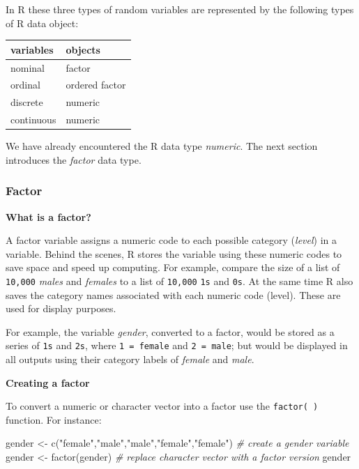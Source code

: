 \documentclass[
]{book}
\newenvironment{Shaded}{\begin{snugshade}}{\end{snugshade}}
\newcommand{\CommentTok}[1]{\textcolor[rgb]{0.56,0.35,0.01}{\textit{#1}}}
\newcommand{\FunctionTok}[1]{\textcolor[rgb]{0.00,0.00,0.00}{#1}}
\newcommand{\NormalTok}[1]{#1}
\newcommand{\OtherTok}[1]{\textcolor[rgb]{0.56,0.35,0.01}{#1}}
\newcommand{\StringTok}[1]{\textcolor[rgb]{0.31,0.60,0.02}{#1}}
\begin{document}
In R these three types of random variables are represented by the following types of R data object:

\begin{tabular}{l|l}
\hline
variables & objects\\
\hline
nominal & factor\\
\hline
ordinal & ordered factor\\
\hline
discrete & numeric\\
\hline
continuous & numeric\\
\hline
\end{tabular}

We have already encountered the R data type \emph{numeric}. The next section introduces the \emph{factor} data type.

\hypertarget{factor}{%
\subsubsection{Factor}\label{factor}}

\textbf{What is a factor?}

A factor variable assigns a numeric code to each possible category (\emph{level}) in a variable. Behind the scenes, R stores the variable using these numeric codes to save space and speed up computing. For example, compare the size of a list of \texttt{10,000} \emph{males} and \emph{females} to a list of \texttt{10,000} \texttt{1s} and \texttt{0s}. At the same time R also saves the category names associated with each numeric code (level). These are used for display purposes.

For example, the variable \emph{gender}, converted to a factor, would be stored as a series of \texttt{1s} and \texttt{2s}, where \texttt{1\ =\ female} and \texttt{2\ =\ male}; but would be displayed in all outputs using their category labels of \emph{female} and \emph{male}.

\textbf{Creating a factor}

To convert a numeric or character vector into a factor use the \texttt{factor(\ )} function. For instance:

\begin{Shaded}
\begin{Highlighting}[]
\NormalTok{gender }\OtherTok{\textless{}{-}} \FunctionTok{c}\NormalTok{(}\StringTok{"female"}\NormalTok{,}\StringTok{"male"}\NormalTok{,}\StringTok{"male"}\NormalTok{,}\StringTok{"female"}\NormalTok{,}\StringTok{"female"}\NormalTok{) }\CommentTok{\# create a gender variable}
\NormalTok{gender }\OtherTok{\textless{}{-}} \FunctionTok{factor}\NormalTok{(gender) }\CommentTok{\# replace character vector with a factor version}
\NormalTok{gender}
\end{Highlighting}
\end{Shaded}
\end{document}

